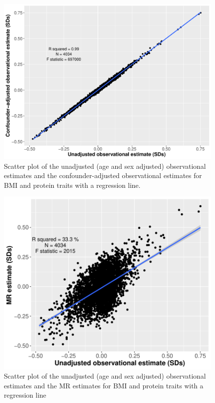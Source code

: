 \documentclass[11pt,twoside]{bristolthesis}
\begin{document}
\begin{figure}
\includegraphics[width=0.9\linewidth]{figure/BMI_protein_INTERVAL/obs_v_obs_adj_scatter} \caption[Scatter plot comparing the unadjusted and confounder-adjusted observational BMI-protein estimates]{Scatter plot of the unadjusted (age and sex adjusted) observational estimates and the confounder-adjusted observational estimates for BMI and protein traits with a regression line.}\label{fig:Estimate-comparison-obs}
\end{figure}
\begin{figure}
\includegraphics[width=0.9\linewidth]{figure/BMI_protein_INTERVAL/unadj_obs_MR_scatter_small} \caption[Scatter plot comparing the observational and MR BMI-protein estimates]{Scatter plot of the unadjusted (age and sex adjusted) observational estimates and the MR estimates for BMI and protein traits with a regression line}\label{fig:Estimate-comparison-obs-mr}
\end{figure}
\end{document}
